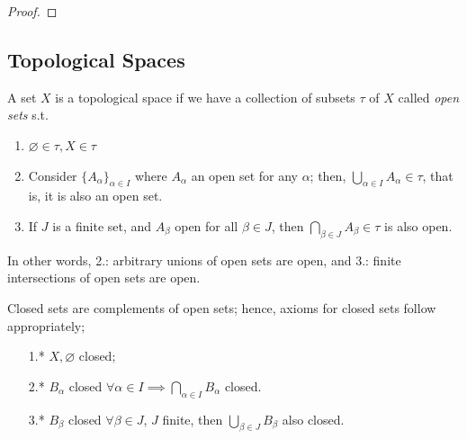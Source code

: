 \begin{proof}
\end{proof}

\subsection{Topological Spaces}

\begin{definition}
    A set $X$ is a topological space if we have a collection of subsets $\tau$ of $X$ called \emph{open sets} s.t. 
    \begin{enumerate}
        \item $\varnothing \in \tau, X \in \tau$
        \item Consider $\{A_\alpha\}_{\alpha \in I}$ where $A_\alpha$ an open set for any $\alpha$; then, $\bigcup_{\alpha \in I} A_\alpha \in \tau$, that is, it is also an open set.
        \item If $J$ is a finite set, and $A_\beta$ open for all $\beta \in J$, then $\bigcap_{\beta \in J} A_\beta \in \tau$ is also open.
    \end{enumerate}
    In other words, 2.: arbitrary unions of open sets are open, and 3.: finite intersections of open sets are open.
\end{definition}

\begin{definition}
    Closed sets are complements of open sets; hence, axioms for closed sets follow appropriately;
    \begin{enumerate}
        \item[1.*] $X, \varnothing$ closed;
        \item[2.*] $B_\alpha$ closed $\forall \alpha \in I \implies \bigcap_{\alpha \in I} B_\alpha$ closed.
        \item[3.*] $B_\beta$ closed $\forall \beta \in J$, $J$ finite, then $\bigcup_{\beta \in J} B_\beta$ also closed. 
    \end{enumerate}
\end{definition}